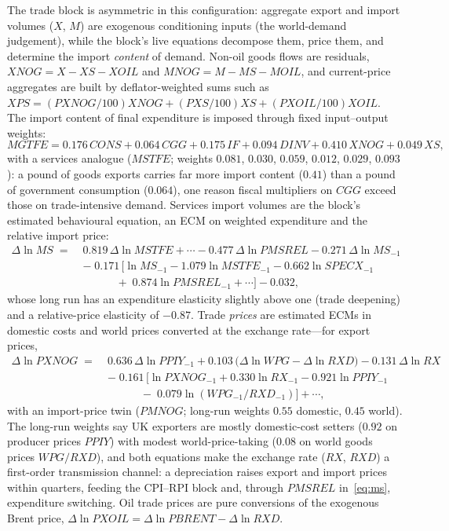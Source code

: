 The trade block is asymmetric in this configuration: aggregate export and import volumes ($X$, $M$) are exogenous conditioning inputs (the world-demand judgement), while the block's live equations decompose them, price them, and determine the import \emph{content} of demand. Non-oil goods flows are residuals, $XNOG = X - XS - XOIL$ and $MNOG = M - MS - MOIL$, and current-price aggregates are built by deflator-weighted sums such as $XPS = (PXNOG/100)XNOG + (PXS/100)XS + (PXOIL/100)XOIL$. The import content of final expenditure is imposed through fixed input--output weights:
\begin{equation}
MGTFE = 0.176\,CONS + 0.064\,CGG + 0.175\,IF + 0.094\,DINV + 0.410\,XNOG + 0.049\,XS,
\label{eq:mgtfe}
\end{equation}
with a services analogue ($MSTFE$; weights $0.081$, $0.030$, $0.059$, $0.012$, $0.029$, $0.093$): a pound of goods exports carries far more import content ($0.41$) than a pound of government consumption ($0.064$), one reason fiscal multipliers on $CGG$ exceed those on trade-intensive demand. Services import volumes are the block's estimated behavioural equation, an ECM on weighted expenditure and the relative import price:
\begin{equation}
\begin{aligned}
\Delta \ln MS \;=\;& 0.819\,\Delta \ln MSTFE + \cdots - 0.477\,\Delta \ln PMSREL - 0.271\,\Delta \ln MS_{-1} \\
&-\; 0.171\,\big[\ln MS_{-1} - 1.079 \ln MSTFE_{-1} - 0.662 \ln SPECX_{-1} \\
&\qquad\quad +\; 0.874 \ln PMSREL_{-1} + \cdots\big] - 0.032,
\end{aligned}
\label{eq:ms}
\end{equation}
whose long run has an expenditure elasticity slightly above one (trade deepening) and a relative-price elasticity of $-0.87$. Trade \emph{prices} are estimated ECMs in domestic costs and world prices converted at the exchange rate---for export prices,
\begin{equation}
\begin{aligned}
\Delta \ln PXNOG \;=\;& 0.636\,\Delta \ln PPIY_{-1} + 0.103\,\big(\Delta \ln WPG - \Delta \ln RXD\big) - 0.131\,\Delta \ln RX \\
&-\; 0.161\,\big[\ln PXNOG_{-1} + 0.330 \ln RX_{-1} - 0.921 \ln PPIY_{-1} \\
&\qquad\quad -\; 0.079 \ln (WPG_{-1}/RXD_{-1})\big] + \cdots,
\end{aligned}
\label{eq:pxnog}
\end{equation}
with an import-price twin ($PMNOG$; long-run weights $0.55$ domestic, $0.45$ world). The long-run weights say UK exporters are mostly domestic-cost setters ($0.92$ on producer prices $PPIY$) with modest world-price-taking ($0.08$ on world goods prices $WPG/RXD$), and both equations make the exchange rate ($RX$, $RXD$) a first-order transmission channel: a depreciation raises export and import prices within quarters, feeding the CPI--RPI block and, through $PMSREL$ in~\eqref{eq:ms}, expenditure switching. Oil trade prices are pure conversions of the exogenous Brent price, $\Delta \ln PXOIL = \Delta \ln PBRENT - \Delta \ln RXD$.

